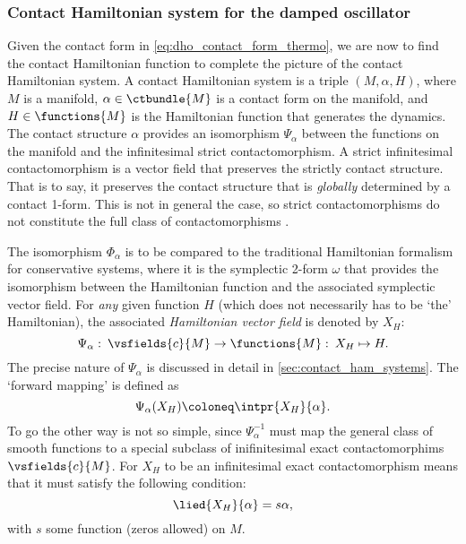 \subsubsection{Contact Hamiltonian system for the damped oscillator}
Given the contact form in \cref{eq:dho_contact_form_thermo}, we are now to find the contact Hamiltonian function to complete the picture of the contact Hamiltonian system.
A contact Hamiltonian system is a triple $(M, \alpha, H)$, where $M$ is a manifold, $\alpha \in \ctbundle{M}$ is a contact form on the manifold, and $H \in \functions{M}$ is the Hamiltonian function that generates the dynamics. The contact structure $\alpha$ provides an isomorphism $\Psi_{\alpha}$ between the functions on the manifold and the infinitesimal strict contactomorphism. A strict infinitesimal contactomorphism is a vector field that preserves the strictly contact structure. That is to say, it preserves the contact structure that is \emph{globally} determined by a contact 1-form. This is not in general the case, so strict contactomorphisms do not constitute the full class of contactomorphisms \cite{Libermann1987,Arnold1989a}.

The isomorphism $\Phi_\alpha$ is to be compared to the traditional Hamiltonian formalism for conservative systems, where it is the symplectic 2-form $\omega$ that provides the isomorphism between the Hamiltonian function and the associated symplectic vector field.
For \emph{any} given function $H$ (which does not necessarily has to be `the' Hamiltonian), the associated \emph{Hamiltonian vector field} is denoted by $X_H$:
\begin{equation}
    \Psi_\alpha: \: \vsfields{c}{M} \to \functions{M}: \: X_H \mapsto H. 
\end{equation}
The precise nature of $\Psi_\alpha$ is discussed in detail in \cref{sec:contact_ham_systems}. The `forward mapping' is defined as
$$ \Psi_\alpha(X_H) \coloneq \intpr{X_H}{\alpha}. $$
To go the other way is not so simple, since $ \Psi_\alpha^{-1}$ must map the general class of smooth functions to a special subclass of inifinitesimal exact contactomorphims $\vsfields{c}{M}$. For $X_H$ to be an infinitesimal exact contactomorphism means that it must satisfy the following condition:
$$ \lied{X_H}{\alpha} = s \alpha, $$
with $s$ some function (zeros allowed) on $M$.

